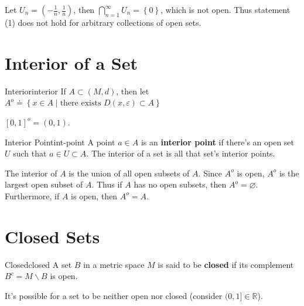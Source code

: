 \documentclass[10pt]{report}
\begin{document}
\begin{ex}{}{}
	Let $U_n = \left( -\frac{1}{n}, \frac{1}{n} \right)$, then $\bigcap_{n=1}^\infty U_n = \left\{ 0 \right\}$, which is not open. Thus statement (1) does not hold for arbitrary collections of open sets.
\end{ex}



\section{Interior of a Set}
\begin{defn}{Interior}{interior}
	If $A \subset (M,d)$, then let $A^o \doteq \left\{ x\in A \;|\; \text{there exists } D(x,\varepsilon) \subset A \right\}$
\end{defn}

\begin{ex}{}{}
	$[0,1]^o = (0,1)$.
\end{ex}

\begin{defn}{Interior Point}{int-point}
	A point $a \in A$ is an \textbf{interior point} if there's an open set $U$ such that $a \in U \subset A$. The interior of a set is all that set's interior points.
\end{defn}

The interior of $A$ is the union of all open subsets of $A$. Since $A^o$ is open, $A^o$ is the largest open subset of $A$. Thus if $A$ has no open subsets, then $A^o=\varnothing$. Furthermore, if $A$ is open, then $A^o=A$.



\section{Closed Sets}
\begin{defn}{Closed}{closed}
	A set $B$ in a metric space $M$ is said to be \textbf{closed} if its complement $B^c = M\backslash B$ is open.
\end{defn}
It's possible for a set to be neither open nor closed (consider $(0,1] \in \mathbb{R}$).
\end{document}
